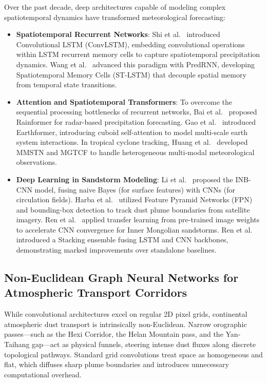 Over the past decade, deep architectures capable of modeling complex spatiotemporal dynamics have transformed meteorological forecasting:
\begin{itemize}
    \item \textbf{Spatiotemporal Recurrent Networks}: Shi et al.~\cite{ref17} introduced Convolutional LSTM (ConvLSTM), embedding convolutional operations within LSTM recurrent memory cells to capture spatiotemporal precipitation dynamics. Wang et al.~\cite{ref18} advanced this paradigm with PredRNN, developing Spatiotemporal Memory Cells (ST-LSTM) that decouple spatial memory from temporal state transitions.
    \item \textbf{Attention and Spatiotemporal Transformers}: To overcome the sequential processing bottlenecks of recurrent networks, Bai et al.~\cite{ref19} proposed Rainformer for radar-based precipitation forecasting. Gao et al.~\cite{ref20} introduced Earthformer, introducing cuboid self-attention to model multi-scale earth system interactions. In tropical cyclone tracking, Huang et al.~\cite{ref21,ref22} developed MMSTN and MGTCF to handle heterogeneous multi-modal meteorological observations.
    \item \textbf{Deep Learning in Sandstorm Modeling}: Li et al.~\cite{ref10} proposed the INB-CNN model, fusing naive Bayes (for surface features) with CNNs (for circulation fields). Harba et al.~\cite{ref11} utilized Feature Pyramid Networks (FPN) and bounding-box detection to track dust plume boundaries from satellite imagery. Ren et al.~\cite{ref12} applied transfer learning from pre-trained image weights to accelerate CNN convergence for Inner Mongolian sandstorms. Ren et al.~\cite{ref16} introduced a Stacking ensemble fusing LSTM and CNN backbones, demonstrating marked improvements over standalone baselines.
\end{itemize}

\subsection{Non-Euclidean Graph Neural Networks for Atmospheric Transport Corridors}
\label{subsec:gnn_review}

While convolutional architectures excel on regular 2D pixel grids, continental atmospheric dust transport is intrinsically non-Euclidean. Narrow orographic passes—such as the Hexi Corridor, the Helan Mountain pass, and the Yan-Taihang gap—act as physical funnels, steering intense dust fluxes along discrete topological pathways. Standard grid convolutions treat space as homogeneous and flat, which diffuses sharp plume boundaries and introduces unnecessary computational overhead.

